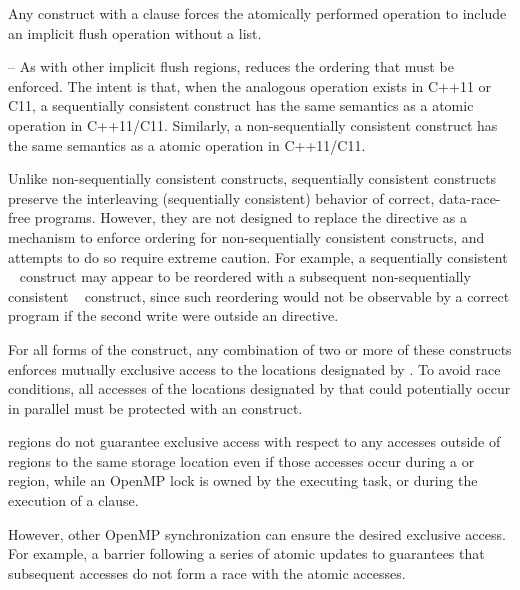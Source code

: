 Any  construct with a  clause forces the atomically performed 
operation to include an implicit flush operation without a list.

\notestart
\noteheader – As with other implicit flush regions, 
reduces the 
ordering that must be enforced. The intent is that, when the analogous operation exists 
in C++11 or C11, a sequentially consistent  construct has the same semantics as 
a  atomic operation in C++11/C11. Similarly, a 
non-sequentially consistent  construct has the same semantics as a 
 atomic operation in C++11/C11.

Unlike non-sequentially consistent  constructs, sequentially consistent  
constructs preserve the interleaving (sequentially consistent) behavior of correct, 
data-race-free programs. However, they are not designed to replace the  directive 
as a mechanism to enforce ordering for non-sequentially consistent  constructs, 
and attempts to do so require extreme caution. For example, a sequentially consistent 
~ construct may appear to be reordered with a subsequent 
non-sequentially consistent ~ construct, since such reordering would not 
be observable by a correct program if the second write were outside an  
directive.
\noteend

For all forms of the  construct, any combination of two or more of these 
 constructs enforces mutually exclusive access to the locations designated by . 
To avoid race conditions, all accesses of the locations designated by  that could 
potentially occur in parallel must be protected with an  construct. 

 regions do not guarantee exclusive access with respect to any accesses outside 
of  regions to the same storage location  even if those accesses occur during a 
 or  region, while an OpenMP lock is owned by the executing 
task, or during the execution of a  clause.

However, other OpenMP synchronization can ensure the desired exclusive access. For 
example, a barrier following a series of atomic updates to  guarantees that subsequent 
accesses do not form a race with the atomic accesses. 

